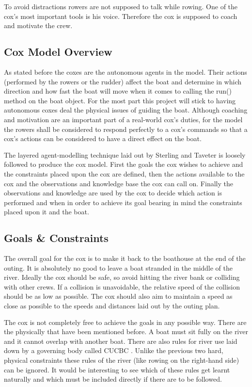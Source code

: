       To avoid distractions rowers are not supposed to talk while rowing. One of the cox's most important tools is his voice. Therefore the cox is supposed to coach and motivate the crew.
      
      \subsection{Cox Model Overview}
      As stated before the coxes are the autonomous agents in the model. Their actions (performed by the rowers or the rudder) affect the boat and determine in which direction and how fast the boat will move when it comes to calling the run() method on the boat object. For the most part this project will stick to having autonomous coxes deal the physical issues of guiding the boat. Although coaching and motivation are an important part of a real-world cox's duties, for the model the rowers shall be considered to respond perfectly to a cox's commands so that a cox's actions can be considered to have a direct effect on the boat.
      
      The layered agent-modelling technique laid out by Sterling and Taveter \cite{Sterling2009} is loosely followed to produce the cox model. First the goals the cox wishes to achieve and the constraints placed upon the cox are defined, then the actions available to the cox and the observations and knowledge base the cox can call on. Finally the observations and knowledge are used by the cox to decide which action is performed and when in order to achieve its goal bearing in mind the constraints placed upon it and the boat.

      \subsection{Goals \& Constraints}
      The overall goal for the cox is to make it back to the boathouse at the end of the outing. It is absolutely no good to leave a boat stranded in the middle of the river. Ideally the cox should be safe, so avoid hitting the river bank or colliding with other crews. If a collision is unavoidable, the relative speed of the collision should be as low as possible. The cox should also aim to maintain a speed as close as possible to the speeds and distances laid out by the outing plan.
      
      The cox is not completely free to achieve the goals in any possible way. There are the physically that have been mentioned before. A boat must sit fully on the river and it cannot overlap with another boat. There are also rules for river use laid down by a governing body called CUCBC \cite{CUCBC}. Unlike the previous two hard, physical constraints these rules of the river (like rowing on the right-hand side) can be ignored. It would be interesting to see which of these rules get learnt naturally and which must be included directly if there are to be followed.
      
